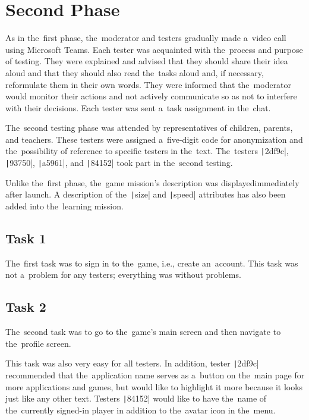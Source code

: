 \section{Second Phase}

As in the~first phase, the~moderator and testers gradually made a~video call using Microsoft Teams.
Each tester was acquainted with the~process and purpose of testing.
They were explained and advised that they should share their idea aloud and that they should also read the~tasks aloud and, if necessary, reformulate them in their own words.
They were informed that the~moderator would monitor their actions and not actively communicate so as not to interfere with their decisions.
Each tester was sent a~task assignment in the~chat.

The~second testing phase was attended by representatives of children, parents, and teachers.
These testers were assigned a~five-digit code for anonymization and the~possibility of reference to specific testers in the~text.
The~testers \texttt|2df9c|, \texttt|93750|, \texttt|a5961|, and \texttt|84152| took part in the~second testing.

Unlike the~first phase, the~game mission's description was displayed\linebreak{}immediately after launch.
A description of the~\texttt|size| and \texttt|speed| attributes has also been added into the~learning mission.

\subsection*{Task 1}

The~first task was to sign in to the~game, i.e., create an~account.
This task was not a~problem for any testers; everything was without problems.

\subsection*{Task 2}

The~second task was to go to the~game's main screen and then navigate to the~profile screen.

This task was also very easy for all testers.
In addition, tester \texttt|2df9c| recommended that the~application name serves as a~button on the~main page for more applications and games, but would like to highlight it more because it looks just like any other text.
Testers \texttt|84152| would like to have the~name of the~currently signed-in player in addition to the~avatar icon in the~menu.

